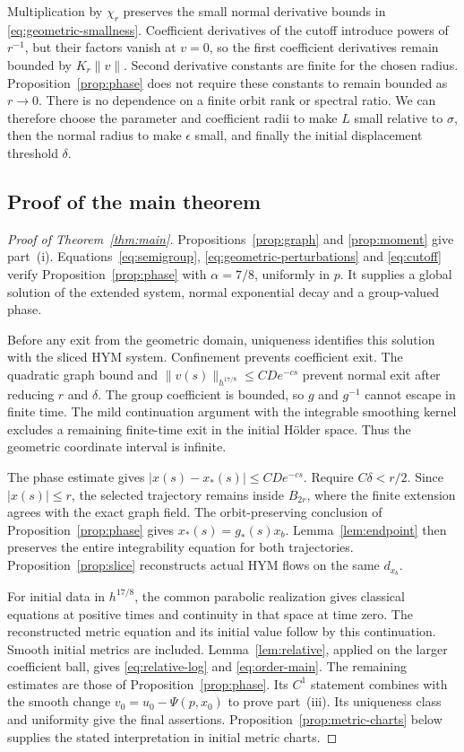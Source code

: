 Multiplication by $\chi_r$ preserves the small normal
derivative bounds in \eqref{eq:geometric-smallness}.
Coefficient derivatives of the cutoff introduce powers
of $r^{-1}$, but their factors vanish at $v=0$, so the
first coefficient derivatives remain bounded by
$K_r\|v\|$. Second derivative constants are finite for
the chosen radius. Proposition~\ref{prop:phase} does not
require these constants to remain bounded as $r\to0$.
There is no dependence on a finite orbit rank or spectral
ratio. We can therefore choose the parameter and coefficient
radii to make $L$ small relative to $\sigma$, then the
normal radius to make $\epsilon$ small, and finally the
initial displacement threshold $\delta$.

\subsection{Proof of the main theorem}
\begin{proof}[Proof of Theorem~\ref{thm:main}]
Propositions~\ref{prop:graph} and \ref{prop:moment} give
part~(i). Equations~\eqref{eq:semigroup},
\eqref{eq:geometric-perturbations} and
\eqref{eq:cutoff} verify Proposition~\ref{prop:phase}
with $\alpha=7/8$, uniformly in $p$.
It supplies a global solution of the extended system,
normal exponential decay and a group-valued phase.

Before any exit from the geometric domain, uniqueness
identifies this solution with the sliced HYM system.
Confinement prevents coefficient exit. The quadratic
graph bound and
$\|v(s)\|_{h^{17/8}}\le CD e^{-cs}$ prevent normal exit
after reducing $r$ and $\delta$. The group coefficient
is bounded, so $g$ and $g^{-1}$ cannot escape in finite
time. The mild continuation argument with the integrable
smoothing kernel excludes a remaining finite-time exit
in the initial H\"older space. Thus the geometric
coordinate interval is infinite.

The phase estimate gives $|x(s)-x_*(s)|\le CD e^{-cs}$.
Require $C\delta<r/2$. Since $|x(s)|\le r$, the
selected trajectory remains inside $B_{2r}$, where
the finite extension agrees with the exact graph field.
The orbit-preserving conclusion of Proposition~\ref{prop:phase}
gives $x_*(s)=g_*(s)x_b$. Lemma~\ref{lem:endpoint}
then preserves the entire integrability equation for
both trajectories. Proposition~\ref{prop:slice}
reconstructs actual HYM flows on the same $d_{x_b}$.

For initial data in $h^{17/8}$, the common parabolic
realization gives classical equations at positive
times and continuity in that space at time zero.
The reconstructed metric equation and its initial
value follow by this continuation. Smooth initial
metrics are included.
Lemma~\ref{lem:relative}, applied on the larger
coefficient ball, gives \eqref{eq:relative-log}
and \eqref{eq:order-main}. The remaining estimates
are those of Proposition~\ref{prop:phase}.
Its $C^1$ statement combines with the smooth change
$v_0=u_0-\Psi(p,x_0)$ to prove part~(iii).
Its uniqueness class and uniformity give the final
assertions. Proposition~\ref{prop:metric-charts}
below supplies the stated interpretation in initial
metric charts.
\end{proof}

